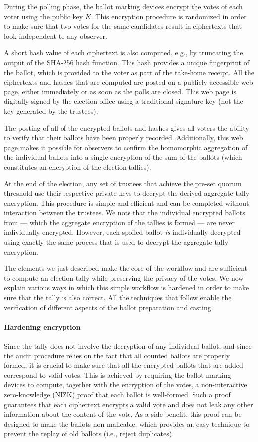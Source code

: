 During the polling phase, the ballot marking devices encrypt the votes
of each voter using the public key $K$. This encryption procedure is
randomized in order to make sure that two votes for the same
candidates result in ciphertexts that look independent to any
observer. 

A short hash value of each ciphertext is also computed, e.g., by
truncating the output of the SHA-256 hash function.  This hash provides
a unique fingerprint of the ballot, which is provided to the voter as
part of the take-home receipt. All the ciphertexts and hashes that are
computed are posted on a publicly accessible web page, either
immediately or as soon as the polls are closed. This web page is
digitally signed by the election office using a traditional signature
key (not the key generated by the trustees).

The posting of all of the encrypted ballots and hashes gives all voters
the ability to verify that their ballots have been properly recorded.
Additionally, this web page makes it possible for observers
to confirm the homomorphic aggregation of the individual ballots into a
single encryption of the sum of the ballots (which constitutes an encryption
of the election tallies). 

At the end of the election, any set of trustees that achieve the pre-set quorum
threshold use their respective private keys to decrypt the derived aggregate tally
encryption.  This procedure is simple and efficient and can be completed
without interaction between the trustees.  We note that the individual 
encrypted ballots from --- which the aggregate encryption of the tallies is formed
--- are never individually encrypted.  However, each spoiled ballot {\em is}
individually decrypted using exactly the same process that is used to decrypt
the aggregate tally encryption.

The elements we just described make the core of the workflow and are
sufficient to compute an election tally while preserving the privacy
of the votes. We now explain various ways in which this simple
workflow is hardened in order to make sure that the tally is also
correct. All the techniques that follow enable the verification of
different aspects of the ballot preparation and casting.

\paragraph{Hardening encryption}
\label{sec:hardening-encryption}
Since the tally does not involve the decryption of any individual
ballot, and since the audit procedure relies on the fact that all
counted ballots are properly formed, it is crucial to make sure that
all the encrypted ballots that are added correspond to valid votes.
This is achieved by requiring the ballot marking devices to compute,
together with the encryption of the votes, a non-interactive
zero-knowledge (NIZK) proof that each ballot is well-formed. Such a
proof guarantees that each ciphertext encrypts a valid vote and does not
leak any other information about the content of the vote. As a side
benefit, this proof can be designed to make the ballots non-malleable,
which provides an easy technique to prevent the replay of old ballots
(i.e., reject duplicates).

